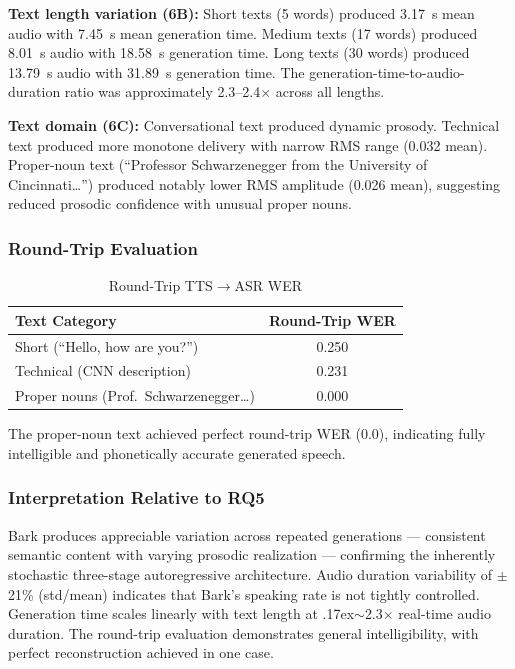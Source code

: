 \documentclass[conference]{IEEEtran}
\begin{document}
\textbf{Text length variation (6B):} Short texts (5 words) produced 3.17~s mean audio with 7.45~s mean generation time. Medium texts (17 words) produced 8.01~s audio with 18.58~s generation time. Long texts (30 words) produced 13.79~s audio with 31.89~s generation time. The generation-time-to-audio-duration ratio was approximately 2.3--2.4$\times$ across all lengths.

\textbf{Text domain (6C):} Conversational text produced dynamic prosody. Technical text produced more monotone delivery with narrow RMS range (0.032 mean). Proper-noun text (``Professor Schwarzenegger from the University of Cincinnati\ldots'') produced notably lower RMS amplitude (0.026 mean), suggesting reduced prosodic confidence with unusual proper nouns.

\subsubsection{Round-Trip Evaluation}

\begin{table}[htbp]
\caption{Round-Trip TTS$\to$ASR WER}
\label{tab:roundtrip}
\centering
\footnotesize
\begin{tabular}{@{}lc@{}}
\toprule
\textbf{Text Category} & \textbf{Round-Trip WER} \\
\midrule
Short (``Hello, how are you?'') & 0.250 \\
Technical (CNN description) & 0.231 \\
Proper nouns (Prof.\ Schwarzenegger\ldots) & 0.000 \\
\bottomrule
\end{tabular}
\end{table}

The proper-noun text achieved perfect round-trip WER (0.0), indicating fully intelligible and phonetically accurate generated speech.

\subsubsection{Interpretation Relative to RQ5}
Bark produces appreciable variation across repeated generations --- consistent semantic content with varying prosodic realization --- confirming the inherently stochastic three-stage autoregressive architecture. Audio duration variability of $\pm$21\% (std/mean) indicates that Bark's speaking rate is not tightly controlled. Generation time scales linearly with text length at {\raise.17ex\hbox{$\scriptstyle\sim$}}2.3$\times$ real-time audio duration. The round-trip evaluation demonstrates general intelligibility, with perfect reconstruction achieved in one case.
\end{document}
